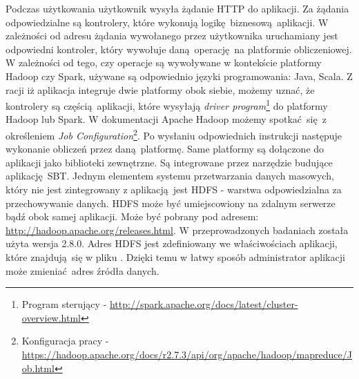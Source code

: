 \newline Podczas użytkowania użytkownik wysyła żądanie HTTP do aplikacji. Za żądania odpowiedzialne są kontrolery, które wykonują logikę biznesową aplikacji. W zależności od adresu żądania wywołanego przez użytkownika uruchamiany jest odpowiedni kontroler, który wywołuje daną operację na platformie obliczeniowej. W zależności od tego, czy operacje są wywoływane w kontekście platformy Hadoop czy Spark, używane są odpowiednio języki programowania: Java, Scala. Z racji iż aplikacja integruje dwie platformy obok siebie, możemy uznać, że kontrolery są częścią aplikacji, które wysyłają \textit{driver program}\footnote{Program sterujący - \url{http://spark.apache.org/docs/latest/cluster-overview.html}} do platformy Hadoop lub Spark. W dokumentacji Apache Hadoop możemy spotkać się z określeniem \textit{Job Configuration}\footnote{Konfiguracja pracy - \url{https://hadoop.apache.org/docs/r2.7.3/api/org/apache/hadoop/mapreduce/Job.html}}. Po wysłaniu odpowiednich instrukcji następuje wykonanie obliczeń przez daną platformę. Same platformy są dołączone do aplikacji jako biblioteki zewnętrzne. Są integrowane przez narzędzie budujące aplikację SBT. Jednym elementem systemu przetwarzania danych masowych, który nie jest zintegrowany z aplikacją jest HDFS - warstwa odpowiedzialna za przechowywanie danych. HDFS może być umiejscowiony na zdalnym serwerze bądź obok samej aplikacji. Może być pobrany pod adresem: \url{http://hadoop.apache.org/releases.html}. W przeprowadzonych badaniach została użyta wersja 2.8.0. Adres HDFS jest zdefiniowany we właściwościach aplikacji, które znajdują się w pliku . Dzięki temu w łatwy sposób administrator aplikacji może zmieniać adres źródła danych.
